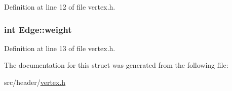 Definition at line 12 of file vertex.\+h.

\subsubsection[{\texorpdfstring{weight}{weight}}]{\setlength{\rightskip}{0pt plus 5cm}int Edge\+::weight}\hypertarget{struct_edge_a4d58e1f4de38fa55549497175981ebab}{}\label{struct_edge_a4d58e1f4de38fa55549497175981ebab}


Definition at line 13 of file vertex.\+h.



The documentation for this struct was generated from the following file\+:\begin{DoxyCompactItemize}
\item 
src/header/\hyperlink{vertex_8h}{vertex.\+h}\end{DoxyCompactItemize}
